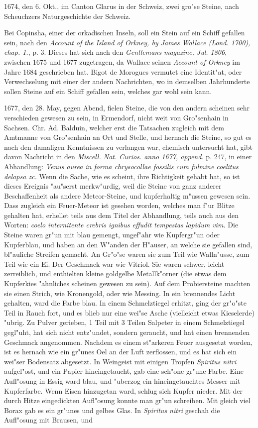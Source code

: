 \documentclass[a4paper, 11pt, oneside, polutonikogreek, german]{article}
\begin{document}
1674, den 6. Okt., im Canton Glarus in der Schweiz, zwei gro"se Steine, nach Scheuchzers Naturgeschichte der Schweiz.

Bei Copinsha, einer der orkadischen Inseln, soll ein Stein auf ein Schiff gefallen sein, nach den \emph{Account of the Island of Orkney, by James Wallace (Lond. 1700), chap. 1.}, p. 3. Dieses hat sich nach den \emph{Gentlemans magazine, Jul. 1806}, zwischen 1675 und 1677 zugetragen, da Wallace seinen \emph{Account of Orkney} im Jahre 1684 geschrieben hat. Bigot de Morogues vermutet eine Identit"at, oder Verwechselung mit einer der andern Nachrichten, wo in demselben Jahrhunderte sollen Steine auf ein Schiff gefallen sein, welches gar wohl sein kann.

1677, den 28. May, gegen Abend, fielen Steine, die von den andern scheinen sehr verschieden gewesen zu sein, in Ermendorf, nicht weit von Gro"senhain in Sachsen. Chr. Ad. Balduin, welcher erst die Tatsachen zugleich mit dem Amtmanne von Gro"senhain an Ort und Stelle, und hernach die Steine, so gut es nach den damaligen Kenntnissen zu verlangen war, chemisch untersucht hat, gibt davon Nachricht in den \emph{Miscell. Nat. Curios. anno 1677, append.} p. 247, in einer Abhandlung: \emph{Venus aurea in forma chrysocollae fossilis cum fulmine coelitus delapsa zc.} Wenn die Sache, wie es scheint, ihre Richtigkeit gehabt hat, so ist dieses Ereignis "au"serst merkw"urdig, weil die Steine von ganz anderer Beschaffenheit als andere Meteor-Steine, und kupferhaltig m"ussen gewesen sein. Dass zugleich ein Feuer-Meteor ist gesehen worden, welches man f"ur Blitze gehalten hat, erhellet teils aus dem Titel der Abhandlung, teils auch aus den Worten: \emph{coelo internitente crebris ignibus effudit tempestas lapidum vim.} Die Steine waren gr"un mit blau gemengt, ungef"ahr wie Kupfergr"un oder Kupferblau, und haben an den W"anden der H"auser, an welche sie gefallen sind, bl"auliche Streifen gemacht. An Gr"o"se waren sie zum Teil wie Walln"usse, zum Teil wie ein Ei. Der Geschmack war wie Vitriol. Sie waren schwer, leicht zerreiblich, und enthielten kleine goldgelbe Metallk"orner (die etwas dem Kupferkies "ahnliches scheinen gewesen zu sein). Auf dem Probiersteine machten sie einen Strich, wie Kronengold, oder wie Messing. In ein brennendes Licht gehalten, ward die Farbe blau. In einem Schmelztiegel erhitzt, ging der gr"o"ste Teil in Rauch fort, und es blieb nur eine wei"se Asche (vielleicht etwas Kieselerde) "ubrig. Zu Pulver gerieben, 1 Teil mit 3 Teilen Salpeter in einem Schmelztiegel gegl"uht, hat sich nicht entz"undet, sondern geraucht, und hat einen brennenden Geschmack angenommen. Nachdem es einem st"arkeren Feuer ausgesetzt worden, ist es hernach wie ein gr"unes Oel an der Luft zerflossen, und es hat sich ein wei"ser Bodensatz abgesetzt. In Weingeist mit einigen Tropfen \emph{Spiritus nitri} aufgel"ost, und ein Papier hineingetaucht, gab eine sch"one gr"une Farbe. Eine Aufl"osung in Essig ward blau, und "uberzog ein hineingetauchtes Messer mit Kupferfarbe. Wenn Eisen hinzugetan ward, schlug sich Kupfer nieder. Mit der durch Hitze eingedickten Aufl"osung konnte man gr"un schreiben. Mit gleich viel Borax gab es ein gr"unes und gelbes Glas. In \emph{Spiritus nitri} geschah die Aufl"osung mit Brausen, und 
\end{document}
